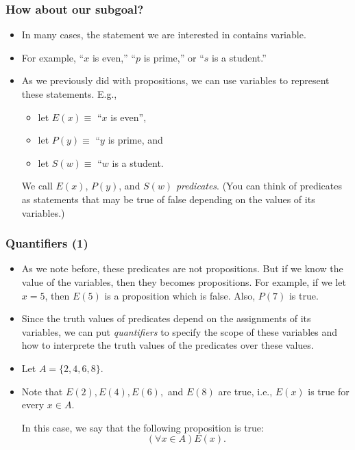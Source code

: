 \documentclass{beamer}
\begin{document}
\begin{frame}\frametitle{How about our subgoal?}
  \begin{itemize}
  \item
    In many cases, the statement we are interested in contains variable.

  \item
    For example, ``$x$ is even,'' ``$p$ is prime,'' or ``$s$ is a student.''
    \pause

  \item
    As we previously did with propositions, we can use variables to
    represent these statements.  E.g.,
    \begin{itemize}
    \item let $E(x)\equiv$ ``$x$ is even'',
    \item let $P(y)\equiv$ ``$y$ is prime, and
    \item let $S(w)\equiv$ ``$w$ is a student.
    \end{itemize}
    We call $E(x)$, $P(y)$, and $S(w)$ {\em predicates}. (You can
    think of predicates as statements that may be true of false
    depending on the values of its variables.)
  \end{itemize}
\end{frame}

\begin{frame}\frametitle{Quantifiers (1)}
  \begin{itemize}
  \item As we note before, these predicates are not propositions.  But
    if we know the value of the variables, then they becomes
    propositions.  For example, if we let $x=5$, then $E(5)$ is a
    proposition which is false.  Also, $P(7)$ is true.
  \item Since the truth values of predicates depend on the assignments
    of its variables, we can put {\em quantifiers} to specify the
    scope of these variables and how to interprete the truth values of
    the predicates over these values.
    \pause
    
  \item Let $A=\{2,4,6,8\}$.
  \item Note that $E(2), E(4), E(6),$ and $E(8)$ are true, i.e.,
    $E(x)$ is true for every $x\in A$.  \pause
    
    In this case, we say that the following proposition is true:
    \[(\forall x\in A) E(x). \]
  \end{itemize}
\end{frame}
\end{document}
